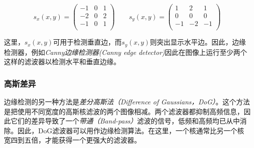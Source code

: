\begin{equation}
s_x(x,y)=
\left(
\begin{array}{ccc}
-1 & 0 & 1\\
-2 & 0 & 2\\
-1 & 0 & 1\\
\end{array}
\right)
\qquad
s_y(x,y)=
\left(
\begin{array}{ccc}
1 & 2 & 1\\
0 & 0 & 0\\
-1 & -2 & -1\\
\end{array}
\right)
\end{equation}


这里，$s_x(x,y)$可用于检测垂直边，而$s_y(x,y)$则突出显示水平边。因此，边缘检测器，例如\emph{Canny边缘检测器(Canny edge detector)}因此在图像上运行至少两个这样的滤波器以检测水平和垂直边缘。


\subsubsection{高斯差异}
边缘检测的另一种方法是\emph{差分高斯法（Difference of Gaussians，DoG）}。这个方法是把使用不同宽度的高斯核滤波的两个图像相减。两个滤波器都抑制高频信息，因此它们的差异导致了一个\emph{带通（Band-pass）}滤波的信号，低频和高频均已从中消除。因此，DoG滤波器可以用作边缘检测算法。在这里，一个核通常比另一个核宽四到五倍，才能获得一个更强大的滤波器。

